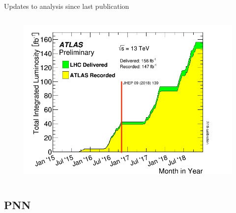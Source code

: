 \documentclass[aspectratio=169,xcolor=table]{beamer}
\begin{document}
\begin{frame}[t]{Updates to analysis since last publication}
\begin{columns}
      \begin{figure}
      \includegraphics[width=1.1\textwidth,keepaspectratio=true]{intlumivstimeRun2.png}
      \caption{\tiny \cite{luminositypublicresultsrun2}}
      \end{figure}
      \end{columns}
    \end{frame}

  \subsection{PNN}
\end{document}
